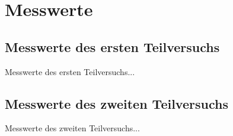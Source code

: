 \chapter{Messwerte}
\label{sec:Werte}

\section{Messwerte des ersten Teilversuchs}

Messwerte des ersten Teilversuchs...

\section{Messwerte des zweiten Teilversuchs}

Messwerte des zweiten Teilversuchs...